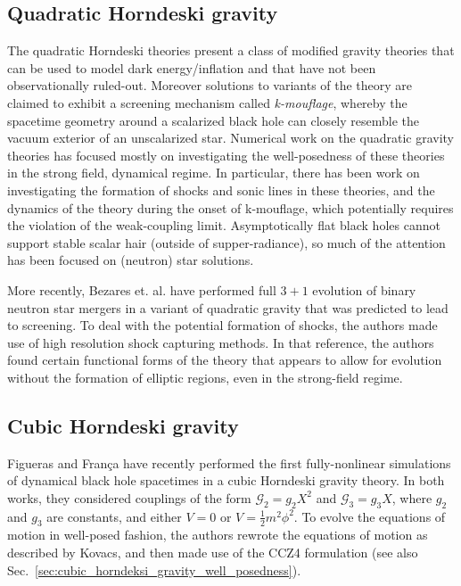 \documentclass{ws-ijmpd}
\begin{document}
\subsection{Quadratic Horndeski gravity
\label{sec:quadratic_horndeski_numerical}}
The quadratic Horndeski theories present a class of modified gravity
theories that can be used to model 
dark energy/inflation\cite{Armendariz-Picon:2000nqq,
Armendariz-Picon:2000ulo} 
and that have not been observationally 
ruled-out\cite{Baker:2017hug,Creminelli:2018xsv,Creminelli:2019kjy}.
Moreover solutions to 
variants of the theory are claimed to 
exhibit a screening mechanism\cite{Joyce:2014kja} called
\emph{k-mouflage}\cite{Babichev:2009ee}, whereby
the spacetime geometry around a scalarized black hole
can closely resemble the vacuum exterior of an unscalarized star.
Numerical work on the quadratic gravity theories has focused
mostly on investigating the well-posedness of these theories
in the strong field, dynamical 
regime\cite{Bernard:2019fjb,Bezares:2020wkn,Lara:2021piy}.
In particular, there has been work on investigating the
formation of shocks and sonic lines in these theories,
and the dynamics of the theory during the onset of
k-mouflage\cite{terHaar:2020xxb,
Bezares:2021yek,Dima:2021pwx}, 
which potentially requires the violation of
the weak-coupling limit. 
Asymptotically flat black holes cannot support stable scalar hair 
(outside of supper-radiance)\cite{Graham:2014mda},
so much of the attention has been focused on (neutron) star solutions.

More recently, Bezares et. al.\cite{Bezares:2021dma} have performed
full $3+1$ evolution of binary neutron star mergers in a variant
of quadratic gravity that was predicted to lead to screening.
To deal with the potential formation of shocks, the authors
made use of high resolution shock capturing methods.
In that reference, the authors found certain functional forms
of the theory that appears to allow 
for evolution without the formation
of elliptic regions, even in the strong-field regime.
\subsection{Cubic Horndeski gravity
\label{sec:cubic_horndeski_numerical}}
Figueras and Fran\c{c}a\cite{Figueras:2020dzx,Figueras:2021abd}
have recently performed the first fully-nonlinear simulations
of dynamical black hole spacetimes in a cubic Horndeski gravity theory.
In both works, they considered couplings of the form
$\mathcal{G}_2=g_2X^2$ and $\mathcal{G}_3=g_3X$, where $g_2$ and
$g_3$ are constants, and either $V=0$\cite{Figueras:2020dzx}
or $V=\frac{1}{2}m^2\phi^2$\cite{Figueras:2021abd}. 
To evolve the equations of motion in well-posed fashion,
the authors rewrote the equations of motion as
described by Kovacs\cite{Kovacs:2019jqj}, and then made
use of the CCZ4 formulation\cite{Bona:2003fj,Alic:2011gg} 
(see also Sec.~\ref{sec:cubic_horndeksi_gravity_well_posedness}).
\end{document}
